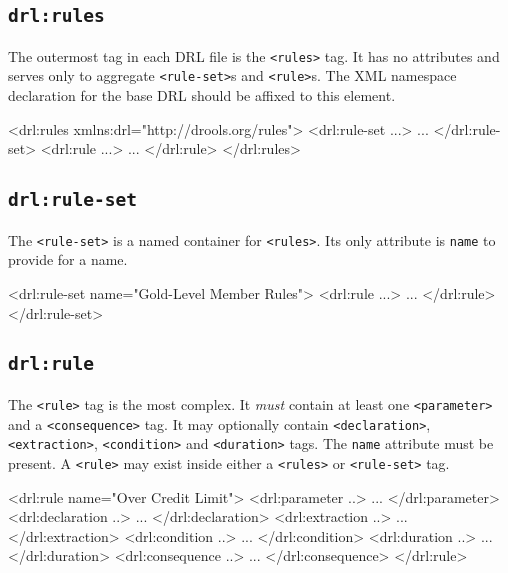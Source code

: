 \subsection{\texttt{drl:rules}}

The outermost tag in each DRL file is the \verb|<rules>| tag.  It has
no attributes and serves only to aggregate \verb|<rule-set>|s and
\verb|<rule>|s. The XML namespace declaration for the base DRL should
be affixed to this element.

\begin{codelisting}
<drl:rules xmlns:drl="http://drools.org/rules">
\textcolor{light}{  <drl:rule-set ...>
    ...
  </drl:rule-set>
  <drl:rule ...>
    ...
  </drl:rule>}
</drl:rules>
\end{codelisting}

\subsection{\texttt{drl:rule-set}}

The \verb|<rule-set>| is a named container for \verb|<rules>|.  Its
only attribute is \verb|name| to provide for a name.  

\begin{codelisting}
<drl:rule-set name="Gold-Level Member Rules">
\textcolor{light}{  <drl:rule ...>
    ...
  </drl:rule>}
</drl:rule-set>
\end{codelisting}

\subsection{\texttt{drl:rule}}

The \verb|<rule>| tag is the most complex.  It \emph{must} contain
at least one \verb|<parameter>| and a \verb|<consequence>| tag.  It
may optionally contain \verb|<declaration>|, \verb|<extraction>|,
\verb|<condition>| and \verb|<duration>| tags.  The \verb|name|
attribute must be present. A \verb|<rule>| may exist inside either 
a \verb|<rules>| or \verb|<rule-set>| tag.

\begin{codelisting}
<drl:rule name="Over Credit Limit">
\textcolor{light}{  <drl:parameter ..>
    ...
  </drl:parameter>
  <drl:declaration ..>
    ...
  </drl:declaration>
  <drl:extraction ..>
    ...
  </drl:extraction>
  <drl:condition ..>
    ...
  </drl:condition>
  <drl:duration ..>
    ...
  </drl:duration>
  <drl:consequence ..>
    ...
  </drl:consequence>}
</drl:rule>
\end{codelisting}

